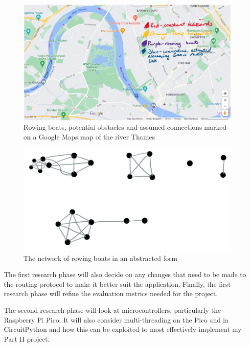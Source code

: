 \documentclass[10pt, a4paper]{article}
\begin{document}
\begin{figure}[h]
\caption{Rowing boats, potential obstacles and assumed connections marked on a Google Maps map of the river Thames}
\begin{center}
\includegraphics[scale=0.5]{googlemaps.jpg}
\end{center}
\end{figure}
\par
\begin{figure}[h]
\begin{center}
\caption{The network of rowing boats in an abstracted form}
\includegraphics[scale=0.5]{lines.jpg}
\end{center}
\end{figure}

The first research phase will also decide on any changes that need to be made to the routing protocol to make it better suit the application. Finally, the first research phase will refine the evaluation metrics needed for the project. \par

The second research phase will look at microcontrollers, particularly the Raspberry Pi Pico. It will also consider multi-threading on the Pico and in CircuitPython and how this can be exploited to most effectively implement my Part II project. \par
\end{document}
